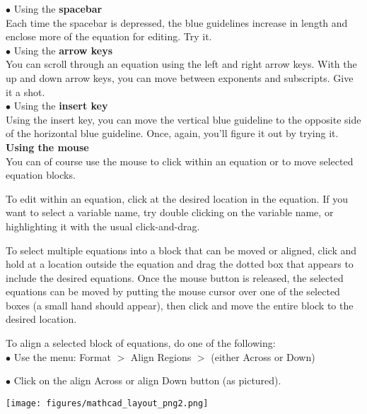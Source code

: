 $\bullet$ Using the \textbf{spacebar}\\

Each time the spacebar is depressed, the blue guidelines increase in length and enclose more of the equation for editing.
Try it.\\

$\bullet$ Using the \textbf{arrow keys}\\

You can scroll through an equation using the left and right arrow keys.  With the up and down arrow keys, you can move between exponents and subscripts. Give it a shot.\\

$\bullet$ Using the \textbf{insert key}\\

Using the insert key, you can move the vertical blue guideline to the opposite side of the horizontal blue guideline. Once, again, you'll figure it out by trying it.\\

\noindent \large \textsf{\textbf{Using the mouse}} \normalsize\\

You can of course use the mouse to click within an equation or to move selected equation blocks.  

To edit within an equation, click at the desired location in the equation.  If you want to select a variable name, try double clicking on the variable name, or highlighting it with the usual click-and-drag.

To select multiple equations into a block that can be moved or aligned, click and hold at a location outside the equation and drag the dotted box that appears to include the desired equations.  Once the mouse button is released, the selected equations can be moved by putting the mouse cursor over one of the selected boxes (a small hand should appear), then click and move the entire block to the desired location.  

To align a selected block of equations, do one of the following:\\

$\bullet$ Use the menu: Format $>$ Align Regions $>$ (either Across or Down)

$\bullet$ Click on the align Across or align Down button (as pictured).

\vspace{.25in}
\hspace{-.5in}\texttt{[image: figures/mathcad\_layout\_png2.png]} %
\vspace{.25in}

